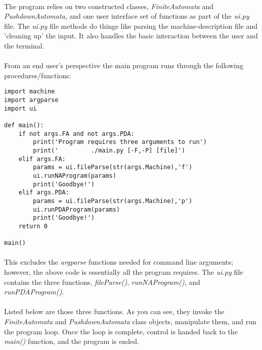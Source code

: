 \documentclass[12pt]{article}
\begin{document}
\paragraph{}
The program relies on two constructed classes, \textit{FiniteAutomata} and \textit{PushdownAutomata}, 
and one user interface set of functions as part of the \textit{ui.py} file.  
The \textit{ui.py} file methods do things like parsing the machine-description file and 'cleaning
up' the input.  It also handles the basic interaction between the user and the terminal.

\paragraph{}
From an end user's perspective the main program runs through the following
procedures/functions:

\begin{lstlisting}
import machine
import argparse
import ui

def main():
    if not args.FA and not args.PDA:
        print('Program requires three arguments to run')
        print('         ./main.py [-F,-P] [file]')
    elif args.FA:
        params = ui.fileParse(str(args.Machine),'f')
        ui.runNAProgram(params)
        print('Goodbye!')
    elif args.PDA:
        params = ui.fileParse(str(args.Machine),'p')
        ui.runPDAProgram(params)
        print('Goodbye!')
    return 0

main()
\end{lstlisting}

\paragraph{}
This excludes the \textit{argparse} functions needed for command line arguments;
however, the above code is essentially all the program requires.  The
\textit{ui.py} file contains the three functions, \textit{fileParse()}, \textit{runNAProgram()}, 
and \textit{runPDAProgram()}.

\paragraph{}
Listed below are those three functions.  As you can see, they invoke the \textit{FiniteAutomata} 
and \textit{PushdownAutomata} class objects, manipulate them, and run the program loop.  Once 
the loop is complete, control is handed back to the \textit{main()} function, and the 
program is ended.
\end{document}
